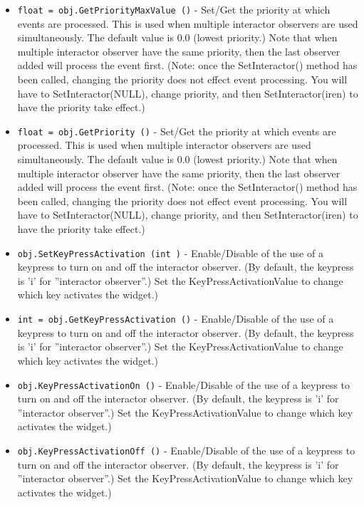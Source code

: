 \begin{itemize}
\item  \verb|float = obj.GetPriorityMaxValue ()| -  Set/Get the priority at which events are processed. This is used when
 multiple interactor observers are used simultaneously. The default value
 is 0.0 (lowest priority.) Note that when multiple interactor observer
 have the same priority, then the last observer added will process the
 event first. (Note: once the SetInteractor() method has been called,
 changing the priority does not effect event processing. You will have
 to SetInteractor(NULL), change priority, and then SetInteractor(iren)
 to have the priority take effect.)

\item  \verb|float = obj.GetPriority ()| -  Set/Get the priority at which events are processed. This is used when
 multiple interactor observers are used simultaneously. The default value
 is 0.0 (lowest priority.) Note that when multiple interactor observer
 have the same priority, then the last observer added will process the
 event first. (Note: once the SetInteractor() method has been called,
 changing the priority does not effect event processing. You will have
 to SetInteractor(NULL), change priority, and then SetInteractor(iren)
 to have the priority take effect.)

\item  \verb|obj.SetKeyPressActivation (int )| -  Enable/Disable of the use of a keypress to turn on and off the
 interactor observer. (By default, the keypress is 'i' for ''interactor
 observer''.)  Set the KeyPressActivationValue to change which key
 activates the widget.)

\item  \verb|int = obj.GetKeyPressActivation ()| -  Enable/Disable of the use of a keypress to turn on and off the
 interactor observer. (By default, the keypress is 'i' for ''interactor
 observer''.)  Set the KeyPressActivationValue to change which key
 activates the widget.)

\item  \verb|obj.KeyPressActivationOn ()| -  Enable/Disable of the use of a keypress to turn on and off the
 interactor observer. (By default, the keypress is 'i' for ''interactor
 observer''.)  Set the KeyPressActivationValue to change which key
 activates the widget.)

\item  \verb|obj.KeyPressActivationOff ()| -  Enable/Disable of the use of a keypress to turn on and off the
 interactor observer. (By default, the keypress is 'i' for ''interactor
 observer''.)  Set the KeyPressActivationValue to change which key
 activates the widget.)


\end{itemize}

